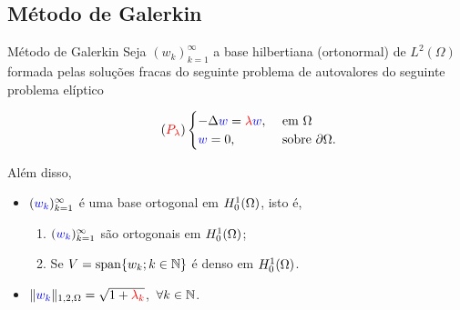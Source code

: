 \subsection*{Método de Galerkin}
\begin{frame}{Método de Galerkin}
Seja {\color{blue}\((w_k)_{k=1}^\infty\) a base hilbertiana (ortonormal)} de 
\(L^2(\Omega)\) formada pelas soluções fracas do seguinte
 {\color{blue}problema  de autovalores} do seguinte problema elíptico
 \vspace{-1em}
\begin{center}
\begin{minipage}{0.5\textwidth}
\begin{equation}\tag{\({\color{red}P_\lambda}\)}\lnum
\begin{cases}
-\Delta {\color{blue}w}={\color{red}\lambda} {\color{blue}w}, & \text{ em } \Omega\\
{\color{blue}w}=0, & \text{ sobre } \partial\Omega.
\end{cases}
\end{equation}
\end{minipage}
\end{center}
Além disso, 
\begin{itemize}
\item  \(({\color{blue}w_k})_{k=1}^\infty \) é uma base
ortogonal  em \(H_0^1(\Omega)\), isto é, \\[0.5em]
\begin{enumerate}
\item \(({\color{blue}w_k})_{k=1}^\infty \) são ortogonais em \(H_0^1(\Omega)\);\\[0.5em]
\item Se \(V=\operatorname{span}\{w_k; k\in \mathbb{N}\}\) é denso em 
\(H_0^1(\Omega)\).
\end{enumerate}
\item  \(\lVert{\color{blue}w_k}\rVert_{1,2,\Omega}=\sqrt{1+{\color{red}\lambda_k}}\),\ \(\forall k\in \mathbb{N}\).
\end{itemize}
\end{frame}
